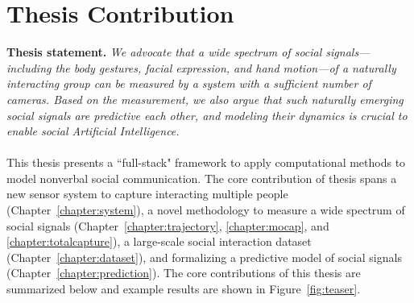 \section{Thesis Contribution}

\noindent \textbf{Thesis statement.}
	\emph{We advocate that a wide spectrum of social signals---including the body gestures, facial expression, and hand motion---of a naturally interacting group can be measured by a system with a sufficient number of cameras. Based on the measurement, we also argue that such naturally emerging social signals are predictive each other, and modeling their dynamics is crucial to enable social Artificial Intelligence.}\\
\mbox{ }\\
\indent This thesis presents a ``full-stack" framework to apply computational methods to model nonverbal social communication. The core contribution of thesis spans a new sensor system to capture interacting multiple people (Chapter~\ref{chapter:system}), a novel methodology to measure a wide spectrum of social signals (Chapter~\ref{chapter:trajectory}, \ref{chapter:mocap}, and  \ref{chapter:totalcapture}), a large-scale social interaction dataset (Chapter~\ref{chapter:dataset}), and formalizing a predictive model of social signals (Chapter~\ref{chapter:prediction}). The core contributions of this thesis are summarized below and example results are shown in Figure~\ref{fig:teaser}.
%
%
%
%
%

